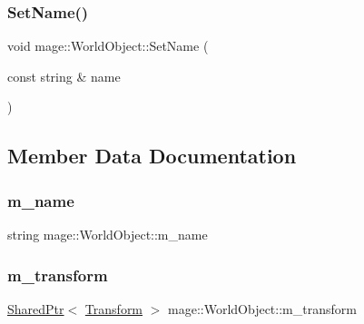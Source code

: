 \hypertarget{classmage_1_1_world_object_aee42f65080a69ed5cfc681382328fe31}{}\label{classmage_1_1_world_object_aee42f65080a69ed5cfc681382328fe31} 
\subsubsection{\texorpdfstring{Set\+Name()}{SetName()}}
{\footnotesize\ttfamily void mage\+::\+World\+Object\+::\+Set\+Name (\begin{DoxyParamCaption}\item[{const string \&}]{name }\end{DoxyParamCaption})}



\subsection{Member Data Documentation}
\hypertarget{classmage_1_1_world_object_a383cc5e1275f389459021a16b958049c}{}\label{classmage_1_1_world_object_a383cc5e1275f389459021a16b958049c} 
\subsubsection{\texorpdfstring{m\+\_\+name}{m\_name}}
{\footnotesize\ttfamily string mage\+::\+World\+Object\+::m\+\_\+name\hspace{0.3cm}{\ttfamily [private]}}

\hypertarget{classmage_1_1_world_object_a599102e219249b46e1cf60c98efd559c}{}\label{classmage_1_1_world_object_a599102e219249b46e1cf60c98efd559c} 
\subsubsection{\texorpdfstring{m\+\_\+transform}{m\_transform}}
{\footnotesize\ttfamily \hyperlink{namespacemage_a1e01ae66713838a7a67d30e44c67703e}{Shared\+Ptr}$<$ \hyperlink{structmage_1_1_transform}{Transform} $>$ mage\+::\+World\+Object\+::m\+\_\+transform\hspace{0.3cm}{\ttfamily [private]}}

